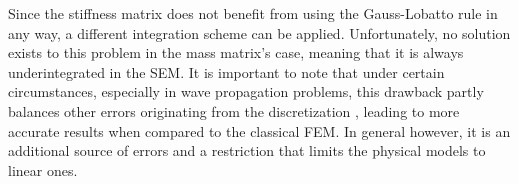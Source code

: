 Since the stiffness matrix does not benefit from using the Gauss-Lobatto rule in any way, a different integration scheme can be applied. Unfortunately, no solution exists to this problem in the mass matrix's case, meaning that it is always underintegrated in the SEM. It is important to note that under certain circumstances, especially in wave propagation problems, this drawback partly balances other errors originating from the discretization \cite{Ainsworth2010}, leading to more accurate results when compared to the classical FEM. In general however, it is an additional source of errors and a restriction that limits the physical models to linear ones.